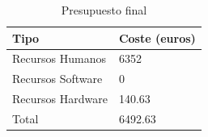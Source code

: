 \begin{table}[H]
    \centering
    \begin{tabular}{|l|l|}
        \hline
        \textbf{Tipo} & \textbf{Coste (euros)} \\
        \hline
        Recursos Humanos & 6352 \\
        \hline
        Recursos Software & 0 \\
        \hline
        Recursos Hardware & 140.63 \\
        \hline
        \hline
        Total & 6492.63 \\
        \hline
    \end{tabular}
    \caption{Presupuesto final}
    \label{tab:tabla_presupuesto_final}
\end{table}